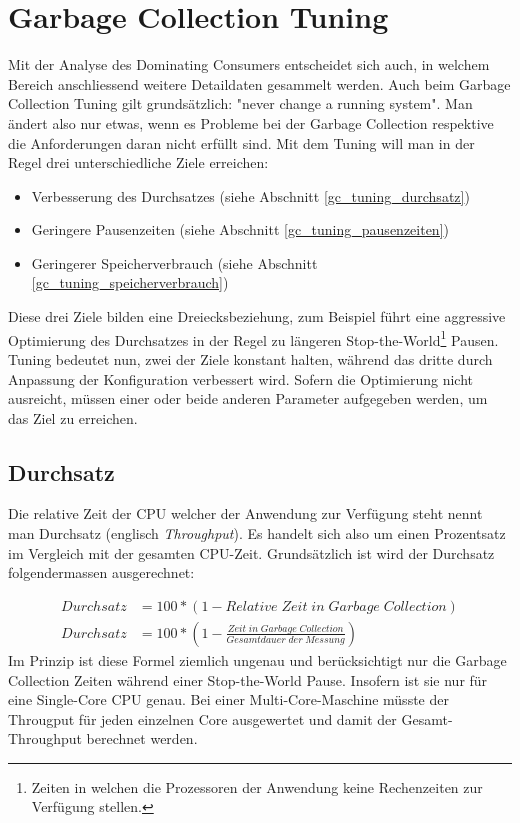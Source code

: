 \section{Garbage Collection Tuning}\label{garbage_collection_tuning}
Mit der Analyse des Dominating Consumers entscheidet sich auch, in welchem Bereich anschliessend weitere Detaildaten gesammelt werden. Auch beim Garbage Collection Tuning gilt grundsätzlich: "never change a running system". Man ändert also nur etwas, wenn es Probleme bei der Garbage Collection respektive die Anforderungen daran nicht erfüllt sind. Mit dem Tuning will man in der Regel drei unterschiedliche Ziele erreichen\cite{langerkreftJavaCore}: 
\begin{itemize}
\item Verbesserung des Durchsatzes (siehe Abschnitt \ref{gc_tuning_durchsatz})
\item Geringere Pausenzeiten (siehe Abschnitt \ref{gc_tuning_pausenzeiten})
\item Geringerer Speicherverbrauch (siehe Abschnitt \ref{gc_tuning_speicherverbrauch})
\end{itemize}

Diese drei Ziele bilden eine Dreiecksbeziehung, zum Beispiel führt eine aggressive Optimierung des Durchsatzes in der Regel zu längeren Stop-the-World\footnote{Zeiten in welchen die Prozessoren der Anwendung keine Rechenzeiten zur Verfügung stellen.} Pausen. Tuning bedeutet nun, zwei der Ziele konstant halten, während das dritte durch Anpassung der Konfiguration verbessert wird. Sofern die Optimierung nicht ausreicht, müssen einer oder beide anderen Parameter aufgegeben werden, um das Ziel zu erreichen.


\subsection{Durchsatz\label{gc_tuning_durchsatz}}
Die relative Zeit der CPU welcher der Anwendung zur Verfügung steht nennt man Durchsatz (englisch \textit{Throughput}). Es handelt sich also um einen Prozentsatz im Vergleich mit der gesamten CPU-Zeit. Grundsätzlich ist wird der Durchsatz folgendermassen ausgerechnet:

 \begin{align*}
         Durchsatz &= 100 * (1-Relative\;Zeit\;in\;Garbage\;Collection)\\
         Durchsatz &= 100 * (1-\frac{Zeit\;in\;Garbage\;Collection}{Gesamtdauer\;der\;Messung})
 \end{align*}
Im Prinzip ist diese Formel ziemlich ungenau und berücksichtigt nur die Garbage Collection Zeiten während einer Stop-the-World Pause. Insofern ist sie nur für eine Single-Core CPU genau. Bei einer Multi-Core-Maschine müsste der Througput für jeden einzelnen Core ausgewertet und damit der Gesamt-Throughput berechnet werden.\newline

